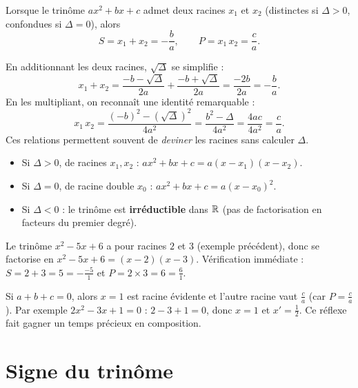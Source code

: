 \begin{theoreme}
Lorsque le trinôme $ax^2+bx+c$ admet deux racines $x_1$ et $x_2$ (distinctes si
$\Delta>0$, confondues si $\Delta=0$), alors
\[ S=x_1+x_2=-\frac{b}{a}, \qquad P=x_1\,x_2=\frac{c}{a}. \]
\end{theoreme}

\begin{aretenir}
En additionnant les deux racines, $\sqrt{\Delta}$ se simplifie :
\[ x_1+x_2=\frac{-b-\sqrt\Delta}{2a}+\frac{-b+\sqrt\Delta}{2a}=\frac{-2b}{2a}=-\frac{b}{a}. \]
En les multipliant, on reconnaît une identité remarquable :
\[ x_1\,x_2=\frac{(-b)^2-(\sqrt\Delta)^2}{4a^2}=\frac{b^2-\Delta}{4a^2}=\frac{4ac}{4a^2}=\frac{c}{a}. \]
Ces relations permettent souvent de \emph{deviner} les racines sans calculer $\Delta$.
\end{aretenir}

\begin{theoreme}
\begin{itemize}
  \item Si $\Delta>0$, de racines $x_1,x_2$ : \quad $ax^2+bx+c=a(x-x_1)(x-x_2)$.
  \item Si $\Delta=0$, de racine double $x_0$ : \quad $ax^2+bx+c=a(x-x_0)^2$.
  \item Si $\Delta<0$ : le trinôme est \textbf{irréductible} dans $\mathbb{R}$ (pas de
        factorisation en facteurs du premier degré).
\end{itemize}
\end{theoreme}

\begin{exemple}
Le trinôme $x^2-5x+6$ a pour racines $2$ et $3$ (exemple précédent), donc se
factorise en $x^2-5x+6=(x-2)(x-3)$. Vérification immédiate : $S=2+3=5=-\frac{-5}{1}$
et $P=2\times 3=6=\frac{6}{1}$.
\end{exemple}

\begin{remarque}
Si $a+b+c=0$, alors $x=1$ est racine évidente et l'autre racine vaut $\frac{c}{a}$
(car $P=\frac{c}{a}$). Par exemple $2x^2-3x+1=0$ : $2-3+1=0$, donc $x=1$ et
$x'=\frac{1}{2}$. Ce réflexe fait gagner un temps précieux en composition.
\end{remarque}

\section{Signe du trinôme}


